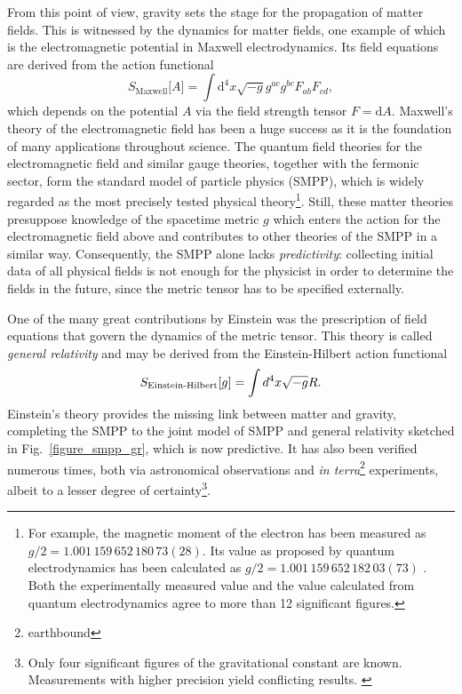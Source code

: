 From this point of view, gravity sets the stage for the propagation of matter fields. This is witnessed by the dynamics for matter fields, one example of which is the electromagnetic potential in Maxwell electrodynamics. Its field equations are derived from the action functional
\begin{equation*}
  S_\text{Maxwell}\lbrack A\rbrack = \int\mathrm d^4x \sqrt{-g} g^{ac} g^{bc} F_{ab} F_{cd},
\end{equation*}
which depends on the potential $A$ via the field strength tensor $F = \mathrm dA$. Maxwell's theory of the electromagnetic field has been a huge success as it is the foundation of many applications throughout science. The quantum field theories for the electromagnetic field and similar gauge theories, together with the fermonic sector, form the standard model of particle physics (SMPP), which is widely regarded as the most precisely tested physical theory\footnote{For example, the magnetic moment of the electron has been measured as $g/2 = 1.001\,159\,652\,180\,73(28)$. \cite{http://dx.doi.org/10.1103/PhysRevA.83.052122} Its value as proposed by quantum electrodynamics has been calculated as $g/2 = 1.001\,159\,652\,182\,03(73)$ \cite{https://doi.org/10.1103/PhysRevD.96.019901}. Both the experimentally measured value and the value calculated from quantum electrodynamics agree to more than 12 significant figures.}. Still, these matter theories presuppose knowledge of the spacetime metric $g$ which enters the action for the electromagnetic field above and contributes to other theories of the SMPP in a similar way. Consequently, the SMPP alone lacks \emph{predictivity}: collecting initial data of all physical fields is not enough for the physicist in order to determine the fields in the future, since the metric tensor has to be specified externally. 

One of the many great contributions by Einstein was the prescription of field equations that govern the dynamics of the metric tensor. \cite{einstein_gr} This theory is called \emph{general relativity} and may be derived from the Einstein-Hilbert action functional
\begin{equation*}
  S_\text{Einstein-Hilbert}\lbrack g\rbrack = \int\mathrm \mathrm d^4x \sqrt{-g} R.
\end{equation*}
Einstein's theory provides the missing link between matter and gravity, completing the SMPP to the joint model of SMPP and general relativity sketched in Fig.~\ref{figure_smpp_gr}, which is now predictive. It has also been verified numerous times, both via astronomical observations and \emph{in terra}\footnote{earthbound} experiments, albeit to a lesser degree of certainty\footnote{Only four significant figures of the gravitational constant are known. \cite{https://doi.org/10.1103/FRevModPhys.88.035009} Measurements with higher precision yield conflicting results. \cite{https://doi.org/10.1103/RevModPhys.84.1527}}.

